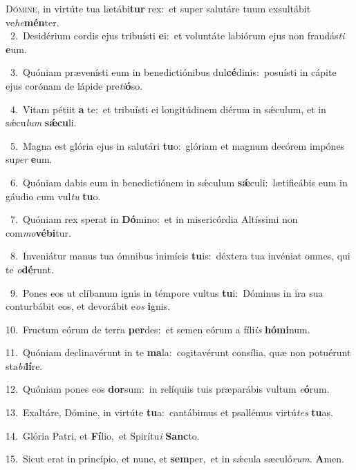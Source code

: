 \lettrine{\initial\textcolor{\initialcolor}{D}}{ómine,} in virtúte tua lætábi\textbf{tur} rex:~\star et super salutáre tuum exsultábit ve\-\textit{he}\-\textbf{mén}ter.\\
{\numbfont\textcolor{\numbcolor}{~2.}}~Desidérium cordis ejus tribuísti \textbf{e}\-i:~\star et voluntáte labiórum ejus non fraudás\textit{ti} \textbf{e}\-um.\par
{\numbfont\textcolor{\numbcolor}{~3.}}~Quóniam prævenísti eum in benedictiónibus dul\-\textbf{cé}\-dinis:~\star posuísti in cápite ejus corónam de lápide pre\-\textit{ti}\-\textbf{ó}so.\par
{\numbfont\textcolor{\numbcolor}{~4.}}~Vitam pétiit \textbf{a} te:~\star et tribuísti ei longitúdinem diérum in sǽculum, et in sǽcu\textit{lum} \textbf{sǽ}\-\textbf{cu}li.\par
{\numbfont\textcolor{\numbcolor}{~5.}}~Magna est glória ejus in salutári \textbf{tu}\-o:~\star glóriam et magnum decórem impónes su\textit{per} \textbf{e}\-um.\par
{\numbfont\textcolor{\numbcolor}{~6.}}~Quóniam dabis eum in benedictiónem in sǽculum \textbf{sǽ}\-culi:~\star lætificábis eum in gáudio cum vul\textit{tu} \textbf{tu}\-o.\par
{\numbfont\textcolor{\numbcolor}{~7.}}~Quóniam rex sperat in \textbf{Dó}\-mino:~\star et in misericórdia Altíssimi non com\-\textit{mo}\-\textbf{vé}\textbf{bi}tur.\par
{\numbfont\textcolor{\numbcolor}{~8.}}~Inveniátur manus tua ómnibus inimícis \textbf{tu}\-is:~\star déxtera tua invéniat omnes, qui te \textit{o}\-\textbf{dé}runt.\par
{\numbfont\textcolor{\numbcolor}{~9.}}~Pones eos ut clíbanum ignis in témpore vultus \textbf{tu}\-i:~\star Dóminus in ira sua conturbábit eos, et devorábit e\textit{os} \textbf{i}\-gnis.\par
{\numbfont\textcolor{\numbcolor}{10.}}~Fructum eórum de terra \textbf{per}\-des:~\star et semen eórum a fíli\textit{is} \textbf{hó}\-\textbf{mi}num.\par
{\numbfont\textcolor{\numbcolor}{11.}}~Quóniam declinavérunt in te \textbf{ma}\-la:~\star cogitavérunt consília, quæ non potuérunt sta\-\textit{bi}\-\textbf{lí}re.\par
{\numbfont\textcolor{\numbcolor}{12.}}~Quóniam pones eos \textbf{dor}\-sum:~\star in relíquiis tuis præparábis vultum \textit{e}\-\textbf{ó}rum.\par
{\numbfont\textcolor{\numbcolor}{13.}}~Exaltáre, Dómine, in virtúte \textbf{tu}\-a:~\star cantábimus et psallémus virtú\textit{tes} \textbf{tu}\-as.\par
{\numbfont\textcolor{\numbcolor}{14.}}~Glória Patri, et \textbf{Fí}\-lio,~\star et Spirítu\textit{i} \textbf{Sanc}\-to.\par
{\numbfont\textcolor{\numbcolor}{15.}}~Sicut erat in princípio, et nunc, et \textbf{sem}\-per,~\star et in sǽcula sæculó\-\textit{rum}\-. \textbf{A}\-men.\par
